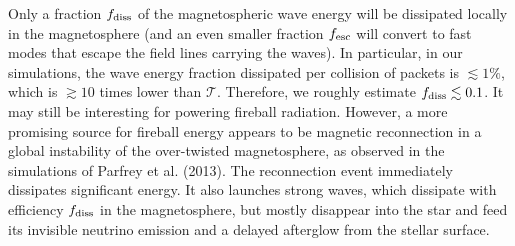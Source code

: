 Only a fraction $f_{\rm diss}$ of  the magnetospheric wave energy will be dissipated locally in the magnetosphere (and an even smaller fraction $f_{\rm esc}$ will convert to fast modes that escape the field lines carrying the \alfven waves). In particular, in our simulations, the wave energy fraction dissipated per collision of packets is $ \lesssim 1\%$, which is $\gtrsim 10$ times lower than $\mathcal{T}$. Therefore, we roughly estimate $f_{\rm diss}\lesssim 0.1$. It may still be interesting for powering fireball radiation. However, a more promising source for fireball energy appears to be magnetic reconnection in a global instability of the over-twisted magnetosphere, as observed in the simulations of Parfrey et al. (2013). The reconnection event immediately dissipates significant energy. It also launches strong waves, which dissipate with efficiency $f_{\rm diss}$ in the magnetosphere, but mostly disappear into the star and feed its invisible neutrino emission and a delayed afterglow from the stellar surface.

